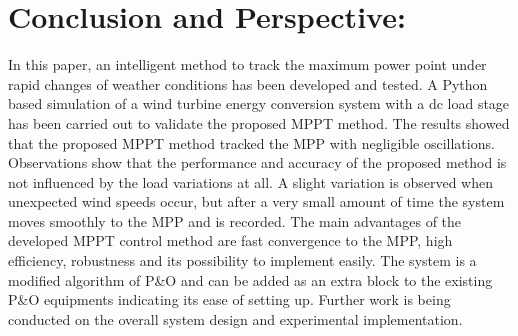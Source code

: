 \section{Conclusion and Perspective:}
In this paper, an intelligent method to track the maximum power point under rapid changes of weather conditions has been developed and tested. A Python based simulation of a wind turbine energy conversion system with a dc load stage has been carried out to validate the proposed MPPT method. The results showed  that the proposed MPPT method tracked the MPP with negligible oscillations. Observations show that the performance and accuracy of the proposed method is not influenced by the load variations at all. A slight variation is observed when unexpected wind speeds occur, but after a very small amount of time the system moves smoothly to the MPP and is recorded. The main advantages of the developed MPPT control method are fast convergence to the MPP, high efficiency, robustness and its possibility to implement easily. The system is a modified algorithm of P\&O and can be added as an extra block to the existing P\&O equipments indicating its ease of setting up. Further work is being conducted on the overall system design and experimental implementation.


